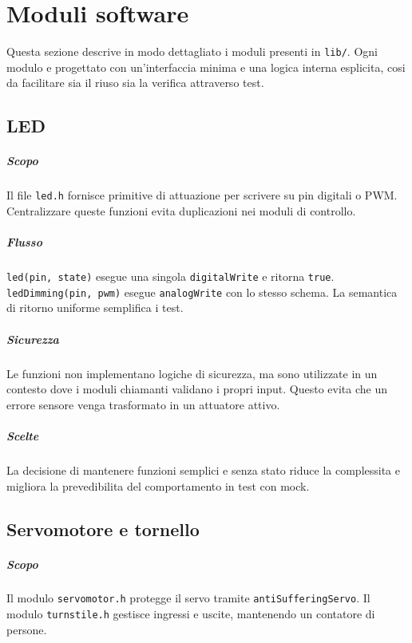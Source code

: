 \chapter{Moduli software}

Questa sezione descrive in modo dettagliato i moduli presenti in \texttt{lib/}. Ogni modulo e progettato con un'interfaccia minima e una logica interna esplicita, cosi da facilitare sia il riuso sia la verifica attraverso test.

\section{LED}
\paragraph{Scopo} Il file \texttt{led.h} fornisce primitive di attuazione per scrivere su pin digitali o PWM. Centralizzare queste funzioni evita duplicazioni nei moduli di controllo.

\paragraph{Flusso} \texttt{led(pin, state)} esegue una singola \texttt{digitalWrite} e ritorna \texttt{true}. \texttt{ledDimming(pin, pwm)} esegue \texttt{analogWrite} con lo stesso schema. La semantica di ritorno uniforme semplifica i test.

\paragraph{Sicurezza} Le funzioni non implementano logiche di sicurezza, ma sono utilizzate in un contesto dove i moduli chiamanti validano i propri input. Questo evita che un errore sensore venga trasformato in un attuatore attivo.

\paragraph{Scelte} La decisione di mantenere funzioni semplici e senza stato riduce la complessita e migliora la prevedibilita del comportamento in test con mock.

\section{Servomotore e tornello}
\paragraph{Scopo} Il modulo \texttt{servomotor.h} protegge il servo tramite \texttt{antiSufferingServo}. Il modulo \texttt{turnstile.h} gestisce ingressi e uscite, mantenendo un contatore di persone.

